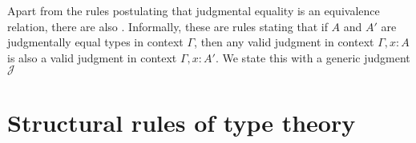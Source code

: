 Apart from the rules postulating that judgmental equality is an equivalence relation, there are also .
Informally, these are rules stating that if $A$ and $A'$ are judgmentally equal types in context $\Gamma$, then any valid judgment in context $\Gamma,x:A$ is also a valid judgment in context $\Gamma,x:A'$. We state this with a generic judgment $\mathcal{J}$
\begin{prooftree}
\end{prooftree}


\section{Structural rules of type theory}

